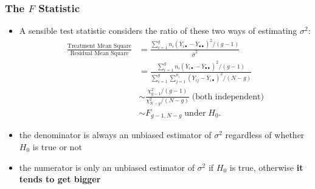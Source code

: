\documentclass[a4paper]{article}\usepackage[]{graphicx}\usepackage[]{xcolor}
\begin{document}
\subsubsection{The \( F \) Statistic}
\begin{itemize}
	\item A sensible test statistic considers the ratio of these two ways of estimating \( \sigma^2 \):
	\begin{align*}
	\frac{\text{Treatment Mean Square}}{\text{Residual Mean Square}} &= \frac{\sum_{i=1}^gn_i(\overline Y_{i\bullet}-\overline Y_{\bullet\bullet})^2/(g-1)}{\hat{\sigma}^2}\\
	& =  \frac{\sum_{i=1}^gn_i(\overline Y_{i\bullet}-\overline Y_{\bullet\bullet})^2/(g-1)}{\sum_{i=1}^g\sum_{j=1}^{n_i}(Y_{ij}-\overline Y_{i\bullet})^2/(N-g)}\\
	& \sim \frac{\chi^2_{g-1}/(g-1)}{\chi^2_{N-g}/(N-g)} \;\text{(both independent)}\\
	& \sim F_{g-1,N-g} \;\text{under}\;H_0.
	\end{align*}
	\item the denominator is always an unbiased estimator of \( \sigma^2 \) regardless of whether \( H_0 \) is true or not
	\item the numerator is only an unbiased estimator of \( \sigma^2 \) if \( H_0 \) is true, otherwise \textbf{it tends to get bigger}
\end{itemize}
\end{document}
